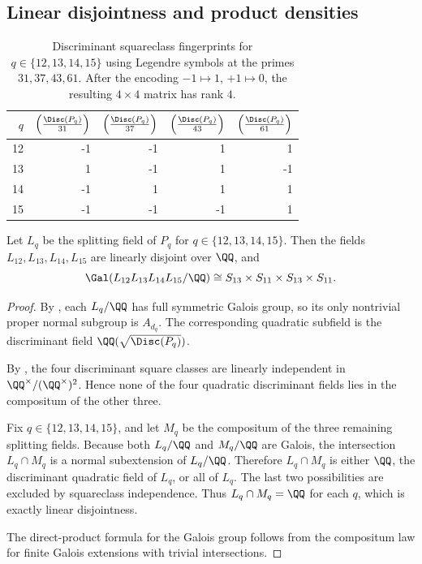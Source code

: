 \subsection{Linear disjointness and product densities}

\begin{table}[t]
\centering
\scriptsize
\setlength{\tabcolsep}{6pt}
\caption{Discriminant squareclass fingerprints for \(q\in\{12,13,14,15\}\)
using Legendre symbols at the primes \(31,37,43,61\).  After the encoding
\(-1\mapsto 1\), \(+1\mapsto 0\), the resulting \(4\times 4\) matrix has rank
\(4\).}
\label{tab:disc-squareclass-q12-15}
\begin{tabular}{r r r r r}
\toprule
\(q\) & \(\left(\frac{\Disc(P_q)}{31}\right)\) &
\(\left(\frac{\Disc(P_q)}{37}\right)\) &
\(\left(\frac{\Disc(P_q)}{43}\right)\) &
\(\left(\frac{\Disc(P_q)}{61}\right)\) \\
\midrule
12 & -1 & -1 & 1 & 1 \\
13 & 1 & -1 & 1 & -1 \\
14 & -1 & 1 & 1 & 1 \\
15 & -1 & -1 & -1 & 1 \\
\bottomrule
\end{tabular}
\end{table}

\begin{theorem}[Linear disjointness for \texorpdfstring{$q=12,13,14,15$}{q=12,13,14,15}]
\label{thm:linear-disjointness}
Let \(L_q\) be the splitting field of \(P_q\) for
\(q\in\{12,13,14,15\}\).  Then the fields \(L_{12},L_{13},L_{14},L_{15}\) are
linearly disjoint over \(\QQ\), and
\[
  \Gal(L_{12}L_{13}L_{14}L_{15}/\QQ)
  \cong
  S_{13}\times S_{11}\times S_{13}\times S_{11}.
\]
\end{theorem}

\begin{proof}
By , each \(L_q/\QQ\) has full symmetric Galois
group, so its only nontrivial proper normal subgroup is \(A_{d_q}\).  The
corresponding quadratic subfield is the discriminant field
\(\QQ(\sqrt{\Disc(P_q)})\).

By , the four discriminant square classes are
linearly independent in \(\QQ^\times/(\QQ^\times)^2\).  Hence none of the four
quadratic discriminant fields lies in the compositum of the other three.

Fix \(q\in\{12,13,14,15\}\), and let \(M_q\) be the compositum of the three
remaining splitting fields.  Because both \(L_q/\QQ\) and \(M_q/\QQ\) are
Galois, the intersection \(L_q\cap M_q\) is a normal subextension of
\(L_q/\QQ\).  Therefore \(L_q\cap M_q\) is either \(\QQ\), the discriminant
quadratic field of \(L_q\), or all of \(L_q\).  The last two possibilities are
excluded by squareclass independence.  Thus \(L_q\cap M_q=\QQ\) for each \(q\),
which is exactly linear disjointness.

The direct-product formula for the Galois group follows from the compositum law
for finite Galois extensions with trivial intersections.
\end{proof}


